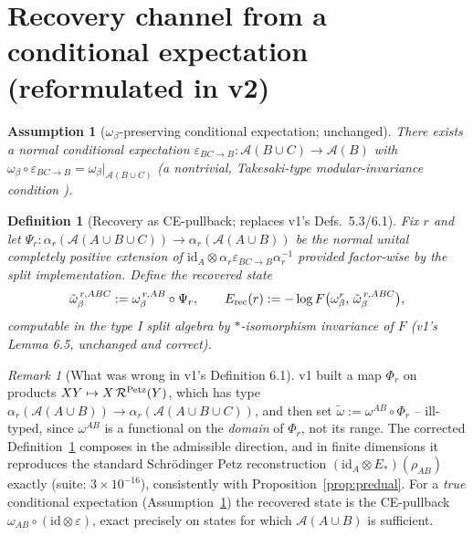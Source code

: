 \documentclass[11pt]{article}
\newtheorem{definition}[theorem]{Definition}
\newtheorem{assumption}[theorem]{Assumption}
\theoremstyle{remark}
\newtheorem{remark}[theorem]{Remark}
\newcommand{\Erec}{E_{\rm rec}}
\begin{document}
\section{Recovery channel from a conditional expectation (reformulated
in v2)}
\begin{assumption}[$\omega_\beta$-preserving conditional expectation;
unchanged]
\label{ass:ce}
There exists a normal conditional expectation $\varepsilon_{BC\to B} :
\mathcal{A}(B\cup C) \to \mathcal{A}(B)$ with $\omega_\beta \circ
\varepsilon_{BC\to B} = \omega_\beta|_{\mathcal{A}(B\cup C)}$ (a
nontrivial, Takesaki-type modular-invariance condition \cite{AC}).
\end{assumption}
\begin{definition}[Recovery as CE-pullback; replaces v1's Defs.~5.3/6.1]
\label{def:recovered}
Fix $r$ and let $\Psi_r : \alpha_r(\mathcal{A}(A\cup B\cup C)) \to
\alpha_r(\mathcal{A}(A\cup B))$ be the normal unital completely positive
extension of $\mathrm{id}_A \otimes \alpha_r\varepsilon_{BC\to B}
\alpha_r^{-1}$ provided factor-wise by the split implementation. Define
the recovered state
\[
\tilde\omega^{\,r,ABC}_\beta := \omega^{\,r,AB}_\beta \circ \Psi_r ,
\qquad
\Erec(r) := -\log F\bigl(\omega^r_\beta,\, \tilde\omega^{\,r,ABC}_\beta
\bigr),
\]
computable in the type I split algebra by $*$-isomorphism invariance of
$F$ (v1's Lemma 6.5, unchanged and correct).
\end{definition}
\begin{remark}[What was wrong in v1's Definition 6.1]
v1 built a map $\Phi_r$ on products $XY \mapsto X\,\mathcal{R}^{\rm
Petz}(Y)$, which has type $\alpha_r(\mathcal{A}(A\cup B)) \to
\alpha_r(\mathcal{A}(A\cup B\cup C))$, and then set $\tilde\omega :=
\omega^{AB}\circ\Phi_r$ -- ill-typed, since $\omega^{AB}$ is a functional
on the \emph{domain} of $\Phi_r$, not its range. The corrected
Definition~\ref{def:recovered} composes in the admissible direction, and
in finite dimensions it reproduces the standard Schr\"odinger Petz
reconstruction $(\mathrm{id}_A \otimes E_*)(\rho_{AB})$ exactly (suite:
$3\times10^{-16}$), consistently with Proposition~\ref{prop:predual}.
For a \emph{true} conditional expectation
(Assumption~\ref{ass:ce}) the recovered state is the CE-pullback
$\omega_{AB}\circ(\mathrm{id}\otimes\varepsilon)$, exact precisely on
states for which $\mathcal{A}(A\cup B)$ is sufficient.
\end{remark}
\end{document}
